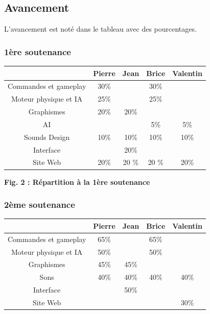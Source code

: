 \documentclass{article}
\begin{document}
\subsection{Avancement}

\par
L'avancement est noté dans le tableau avec des pourcentages.
\newline

\subsubsection{1ère soutenance}

\begin{center}
\begin{tabular}{|c|c|c|c|c|}
\hline
 & Pierre & Jean & Brice & Valentin \\
\hline
Commandes et gameplay & 30\% & & 30\% & \\
\hline
Moteur physique et IA & 25\% & & 25\%  & \\
\hline
Graphismes & 20\% & 20\% & & \\
\hline
AI  &  & & 5\%& 5\%\\

\hline
Sounds Design& 10\% & 10\% & 10\% & 10\% \\
\hline
Interface & & 20\% & & \\
\hline
Site Web & 20\%& 20 \%&20 \% & 20\% \\
\hline
\end{tabular}
\end{center}

\begin{center}
\bf{Fig. 2 : Répartition à la 1ère soutenance}
\end{center}

\subsubsection{2ème soutenance}

\begin{center}
\begin{tabular}{|c|c|c|c|c|}
\hline
 & Pierre & Jean & Brice & Valentin \\
\hline
Commandes et gameplay & 65\% & & 65\% & \\
\hline
Moteur physique et IA & 50\% & & 50\% & \\
\hline
Graphismes & 45\% & 45\% & & \\

\hline
Sons & 40\% & 40\% & 40\% & 40\% \\
\hline
Interface & & 50\% & & \\
\hline
Site Web & & & & 30\% \\
\hline
\end{tabular}
\end{center}
\end{document}
